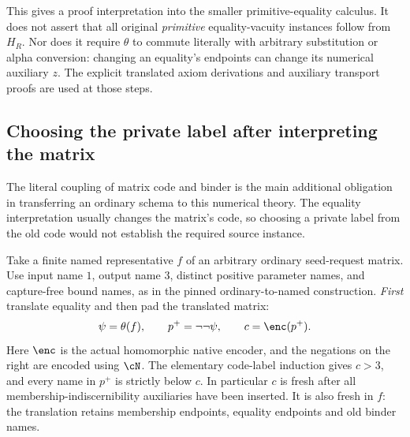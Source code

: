 This gives a proof interpretation into the smaller primitive-equality
calculus.  It does not assert that all original \emph{primitive}
equality-vacuity instances follow from $H_R$.  Nor does it require
$\theta$ to commute literally with arbitrary substitution or alpha
conversion: changing an equality's endpoints can change its numerical
auxiliary $z$.  The explicit translated axiom derivations and auxiliary
transport proofs are used at those steps.

\subsection{Choosing the private label after interpreting the matrix}
\label{sec:ks-code-coupling}

The literal coupling of matrix code and binder is the main additional
obligation in transferring an ordinary schema to this numerical theory.
The equality interpretation usually changes the matrix's code, so
choosing a private label from the old code would not establish the
required source instance.

Take a finite named representative $f$ of an arbitrary ordinary
seed-request matrix.  Use input name $1$, output name $3$, distinct
positive parameter names, and capture-free bound names, as in the
pinned ordinary-to-named construction.  \emph{First} translate equality
and then pad the translated matrix:
\begin{equation}
       \psi=\theta(f),\qquad
       p^{+}=\neg\neg\psi,\qquad
       c=\enc(p^{+}).
 \label{eq:ks-code-choice}
\end{equation}
Here $\enc$ is the actual homomorphic native encoder, and the negations
on the right are encoded using $\cN$.  The elementary code-label
induction gives $c>3$, and every name in $p^{+}$ is strictly below $c$.
In particular $c$ is fresh after all membership-indiscernibility
auxiliaries have been inserted.  It is also fresh in $f$: the translation
retains membership endpoints, equality endpoints and old binder names.


